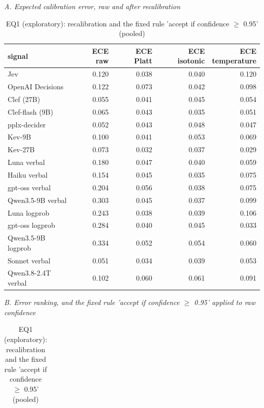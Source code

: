 \begin{table}[t]
\centering
\small
\caption{EQ1 (exploratory): recalibration and the fixed rule 'accept if confidence $\geq$ 0.95' (pooled)}
\label{tab:tab07_triage_rules}
\par\textit{A. Expected calibration error, raw and after recalibration}\par\smallskip
\begin{adjustbox}{max width=\linewidth}
\begin{tabular}{lrrrr}
\toprule
signal & ECE raw & ECE Platt & ECE isotonic & \makecell[br]{ECE \\{} temperature} \\
\midrule
Jev & 0.120 & 0.038 & 0.040 & 0.120 \\
OpenAI Decisions & 0.122 & 0.073 & 0.042 & 0.098 \\
Clef (27B) & 0.055 & 0.041 & 0.045 & 0.054 \\
Clef-flash (9B) & 0.065 & 0.043 & 0.035 & 0.051 \\
pplx-decider & 0.052 & 0.043 & 0.048 & 0.047 \\
Kev-9B & 0.100 & 0.041 & 0.053 & 0.069 \\
Kev-27B & 0.073 & 0.032 & 0.037 & 0.029 \\
Luna verbal & 0.180 & 0.047 & 0.040 & 0.059 \\
Haiku verbal & 0.154 & 0.045 & 0.035 & 0.075 \\
gpt-oss verbal & 0.204 & 0.056 & 0.038 & 0.075 \\
Qwen3.5-9B verbal & 0.303 & 0.045 & 0.037 & 0.099 \\
Luna logprob & 0.243 & 0.038 & 0.039 & 0.106 \\
gpt-oss logprob & 0.284 & 0.040 & 0.045 & 0.033 \\
Qwen3.5-9B logprob & 0.334 & 0.052 & 0.054 & 0.060 \\
Sonnet verbal & 0.051 & 0.034 & 0.039 & 0.053 \\
Qwen3.8-2.4T verbal & 0.102 & 0.060 & 0.061 & 0.091 \\
\bottomrule
\end{tabular}
\end{adjustbox}
\medskip
\par\textit{B. Error ranking, and the fixed rule 'accept if confidence $\geq$ 0.95' applied to raw confidence}\par\smallskip
\begin{adjustbox}{max width=\linewidth}
\begin{tabular}{lrrrr}
\toprule

\end{tabular}
\end{adjustbox}
\end{table}
